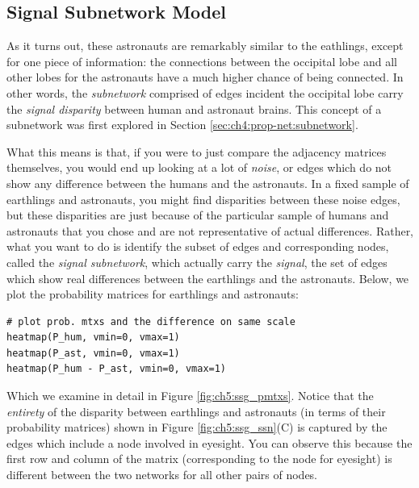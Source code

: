 \subsection{Signal Subnetwork Model}

As it turns out, these astronauts are remarkably similar to the eathlings, except for one piece of information: the connections between the occipital lobe and all other lobes for the astronauts have a much higher chance of being connected. In other words, the \textit{subnetwork} comprised of edges incident the occipital lobe carry the \textit{signal disparity} between human and astronaut brains. This concept of a subnetwork was first explored in Section \ref{sec:ch4:prop-net:subnetwork}. 

What this means is that, if you were to just compare the adjacency matrices themselves, you would end up looking at a lot of \textit{noise}, or edges which do not show any difference between the humans and the astronauts. In a fixed sample of earthlings and astronauts, you might find disparities between these noise edges, but these disparities are just because of the particular sample of humans and astronauts that you chose and are not representative of actual differences. Rather, what you want to do is identify the subset of edges and corresponding nodes, called the \textit{signal subnetwork}, which actually carry the \textit{signal}, the set of edges which show real differences between the earthlings and the astronauts. Below, we plot the probability matrices for earthlings and astronauts:

\begin{lstlisting}[style=python]
# plot prob. mtxs and the difference on same scale
heatmap(P_hum, vmin=0, vmax=1)
heatmap(P_ast, vmin=0, vmax=1)
heatmap(P_hum - P_ast, vmin=0, vmax=1)
\end{lstlisting}

Which we examine in detail in Figure \ref{fig:ch5:ssg_pmtxs}. Notice that the \textit{entirety} of the disparity between earthlings and astronauts (in terms of their probability matrices) shown in Figure \ref{fig:ch5:ssg_ssn}(C) is captured by the edges which include a node involved in eyesight. You can observe this because the first row and column of the matrix (corresponding to the node for eyesight) is different between the two networks for all other pairs of nodes.

